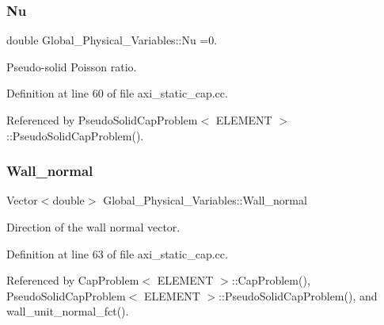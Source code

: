 \subsubsection{\texorpdfstring{Nu}{Nu}}
{\footnotesize\ttfamily double Global\+\_\+\+Physical\+\_\+\+Variables\+::\+Nu =0.}



Pseudo-\/solid Poisson ratio. 



Definition at line 60 of file axi\+\_\+static\+\_\+cap.\+cc.



Referenced by Pseudo\+Solid\+Cap\+Problem$<$ E\+L\+E\+M\+E\+N\+T $>$\+::\+Pseudo\+Solid\+Cap\+Problem().

\mbox{\label{namespaceGlobal__Physical__Variables_a5feb3df21fc4a0adefadecb8a8ed98d7}} 
\subsubsection{\texorpdfstring{Wall\+\_\+normal}{Wall\_normal}}
{\footnotesize\ttfamily Vector$<$double$>$ Global\+\_\+\+Physical\+\_\+\+Variables\+::\+Wall\+\_\+normal}



Direction of the wall normal vector. 



Definition at line 63 of file axi\+\_\+static\+\_\+cap.\+cc.



Referenced by Cap\+Problem$<$ E\+L\+E\+M\+E\+N\+T $>$\+::\+Cap\+Problem(), Pseudo\+Solid\+Cap\+Problem$<$ E\+L\+E\+M\+E\+N\+T $>$\+::\+Pseudo\+Solid\+Cap\+Problem(), and wall\+\_\+unit\+\_\+normal\+\_\+fct().

